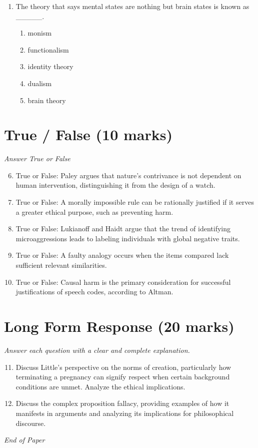 \documentclass[12pt]{article}
\begin{document}
\begin{enumerate}[label=\arabic*.]
\begin{enumerate}[label=(\alph*)]
    \item jumping to a conclusion
    \item ad novitatem
\end{enumerate}
\item The theory that says mental states are nothing but brain states is known as \_\_\_\_\_.
\begin{enumerate}[label=(\alph*)]
    \item monism
    \item functionalism
    \item identity theory
    \item dualism
    \item brain theory
\end{enumerate}
\end{enumerate}

\section*{True / False (10 marks)}
\textit{Answer True or False}
\begin{enumerate}[label=\arabic*.]
\setcounter{enumi}{5}
\item True or False: Paley argues that nature's contrivance is not dependent on human intervention, distinguishing it from the design of a watch.
\item True or False: A morally impossible rule can be rationally justified if it serves a greater ethical purpose, such as preventing harm.
\item True or False: Lukianoff and Haidt argue that the trend of identifying microaggressions leads to labeling individuals with global negative traits.
\item True or False: A faulty analogy occurs when the items compared lack sufficient relevant similarities.
\item True or False: Causal harm is the primary consideration for successful justifications of speech codes, according to Altman.
\end{enumerate}

\section*{Long Form Response (20 marks)}
\textit{Answer each question with a clear and complete explanation.}
\begin{enumerate}[label=\arabic*.]
\setcounter{enumi}{10}
\item Discuss Little's perspective on the norms of creation, particularly how terminating a pregnancy can signify respect when certain background conditions are unmet. Analyze the ethical implications.
\item Discuss the complex proposition fallacy, providing examples of how it manifests in arguments and analyzing its implications for philosophical discourse.
\end{enumerate}

\vfill
\noindent\textit{End of Paper}
\end{document}
